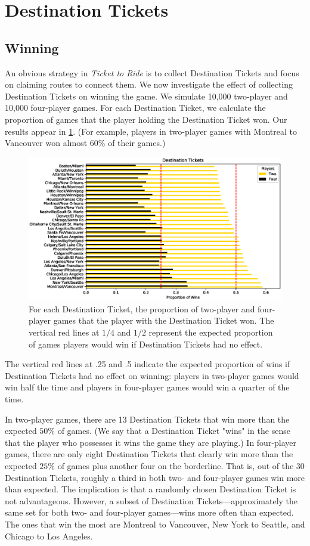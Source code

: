 \section{Destination Tickets}
\label{sec:tickets}
\subsection{Winning}
\label{sec:winning}
An obvious strategy in \textit{Ticket to Ride} is to collect
Destination Tickets and focus on claiming routes to connect them.
We now investigate the effect of collecting Destination Tickets
on winning the game.
We simulate 10,000 two-player and 10,000 four-player games.
For each Destination Ticket, we calculate the proportion of 
games that the player holding the Destination Ticket won.
Our results appear in \cref{fig:tickets}.
(For example, players in two-player games with Montreal 
to Vancouver won almost $60\%$ of their games.)

\begin{figure}[H]
\centering
\includegraphics[scale=.6]{figures/destination_tickets}
\caption{For each Destination Ticket,
the proportion of two-player and four-player games that 
the player with the Destination Ticket won.
The vertical red lines at $1/4$ and $1/2$ represent
the expected proportion of games players would win
if Destination Tickets had no effect.}
\label{fig:tickets}
\end{figure}

The vertical red lines at .25 and .5 indicate
the expected proportion of wins if Destination Tickets
had no effect on winning: players in two-player games
would win half the time and players in four-player games
would win a quarter of the time.

In two-player games, there are 13 Destination Tickets 
that win more than the expected $50\%$ of games.
(We say that a Destination Ticket "wins" in the sense
that the player who possesses it wins the game they
are playing.)
In four-player games, there are only eight Destination Tickets
that clearly win more than the expected $25\%$ of games plus
another four on the borderline.
That is, out of the 30 Destination Tickets, roughly a third
in both two- and four-player games win more than expected.
The implication is that a randomly chosen Destination 
Ticket is not advantageous.
However, a subset of Destination Tickets---approximately the same
set for both two- and four-player games---wins more often than expected.
The ones that win the most are Montreal to Vancouver,
New York to Seattle, and Chicago to Los Angeles.

